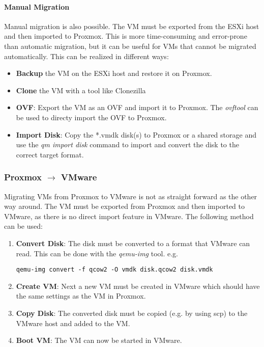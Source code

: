 \paragraph{Manual Migration}
Manual migration is also possible. The VM must be exported from the ESXi host and then imported to Proxmox. This is more time-consuming and error-prone than automatic migration, but it can be useful for VMs that cannot be migrated automatically.\newline
This can be realized in different ways:
\begin{itemize}
    \item \textbf{Backup} the VM on the ESXi host and restore it on Proxmox.
    \item \textbf{Clone} the VM with a tool like Clonezilla
    \item \textbf{OVF}: Export the VM as an OVF and import it to Proxmox. The \textit{ovftool} can be used to directy import the OVF to Proxmox.
    \item \textbf{Import Disk}: Copy the *.vmdk disk(s) to Proxmox or a shared storage and use the \textit{qm import disk} command to import and convert the disk to the correct target format.
\end{itemize}

\subsubsection{Proxmox $\rightarrow$ VMware}
Migrating VMs from Proxmox to VMware is not as straight forward as the other way around. The VM must be exported from Proxmox and then imported to VMware, as there is no direct import feature in VMware. The following method can be used:
\begin{enumerate}
    \item \textbf{Convert Disk}: The disk must be converted to a format that VMware can read. This can be done with the \textit{qemu-img} tool. 
    e.g. \begin{verbatim}qemu-img convert -f qcow2 -O vmdk disk.qcow2 disk.vmdk\end{verbatim}
    \item \textbf{Create VM}: Next a new VM must be created in VMware which should have the same settings as the VM in Proxmox.
    \item \textbf{Copy Disk}: The converted disk must be copied (e.g. by using scp) to the VMware host and added to the VM. 
    \item \textbf{Boot VM}: The VM can now be started in VMware.
\end{enumerate}

